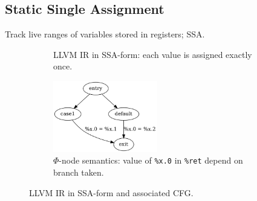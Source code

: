 
\subsection{Static Single Assignment}



Track live ranges of variables stored in registers; SSA.


\begin{figure}[htbp]
	\centering
	\begin{subfigure}[ht]{0.50\textwidth}
		
		\caption{LLVM IR in SSA-form: each value is assigned exactly once.}
		\label{fig:ssa_form}
	\end{subfigure}
	\begin{subfigure}[ht]{0.50\textwidth}
		\centering
		\includegraphics[width=0.50\textwidth]{inc/phi.png}
		\caption{$\Phi$-node semantics: value of \texttt{\%x.0} in \texttt{\%ret} depend on branch taken.}
		\label{fig:phi_node_semantics}
	\end{subfigure}
	\caption{LLVM IR in SSA-form and associated CFG.}
\end{figure}
